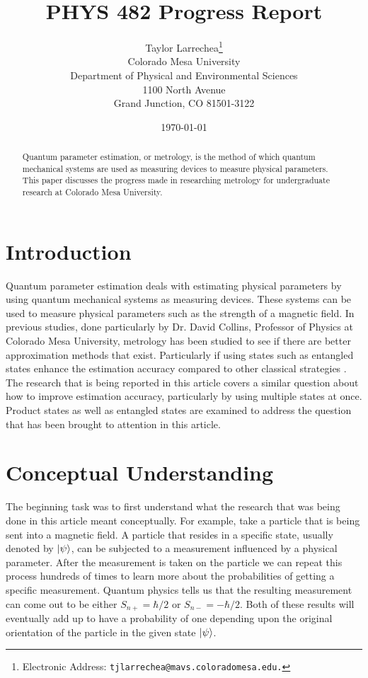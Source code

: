 \documentclass[twocolumn]{article}
\title{\textbf{PHYS 482 Progress Report}}
\author{Taylor Larrechea\footnote{Electronic Address: \texttt{tjlarrechea@mavs.coloradomesa.edu.}} \\
    Colorado Mesa University \\
    Department of Physical and Environmental Sciences \\
    1100 North Avenue \\
    Grand Junction, CO 81501-3122}
\date{\today}
\begin{document}
\maketitle
\begin{abstract}
Quantum parameter estimation, or metrology, is the method of which quantum mechanical systems are used as measuring devices to measure physical parameters. This paper discusses the progress made in researching metrology for undergraduate research at Colorado Mesa University.
\end{abstract}
\section*{Introduction}
Quantum parameter estimation deals with estimating physical parameters by using quantum mechanical systems as measuring devices. These systems can be used to measure physical parameters such as the strength of a magnetic field. In previous studies, done particularly by Dr. David Collins, Professor of Physics at Colorado Mesa University, metrology has been studied to see if there are better approximation methods that exist. Particularly if using states such as entangled states enhance the estimation accuracy compared to other classical strategies \cite{D. Collins}. The research that is being reported in this article covers a similar question about how to improve estimation accuracy, particularly by using multiple states at once. Product states as well as entangled states are examined to address the question that has been brought to attention in this article.
\section*{Conceptual Understanding}
The beginning task was to first understand what the research that was being done in this article meant conceptually. For example, take a particle that is being sent into a magnetic field. A particle that resides in a specific state, usually denoted by $\ket{\psi}$, can be subjected to a measurement influenced by a physical parameter. After the measurement is taken on the particle we can repeat this process hundreds of times to learn more about the probabilities of getting a specific measurement. Quantum physics tells us that the resulting measurement can come out to be either $S_{n+}=\hbar/2$ or $S_{n-}=-\hbar/2$. Both of these results will eventually add up to have a probability of one depending upon the original orientation of the particle in the given state $\ket{\psi}$.
\end{document}
